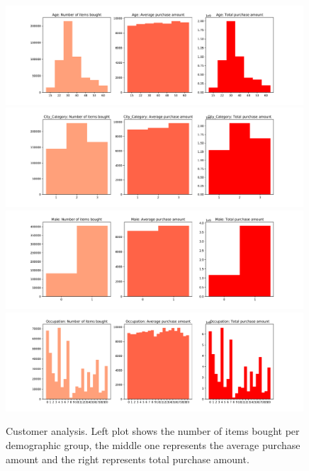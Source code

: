 \documentclass{article}
\begin{document}
\begin{figure}[h]
  \begin{center}
    \includegraphics[width=0.99\textwidth]{plots/customers_Age.pdf}
    \includegraphics[width=0.99\textwidth]{plots/customers_City_Category.pdf}
    \includegraphics[width=0.99\textwidth]{plots/customers_Male.pdf}
    \includegraphics[width=0.99\textwidth]{plots/customers_Occupation.pdf}

  \end{center}
  \caption{Customer analysis. Left plot shows the number of items bought per demographic group, the middle one represents the average purchase amount and the right represents total purchase amount.}
  \label{fig:customers}
\end{figure}
\end{document}
